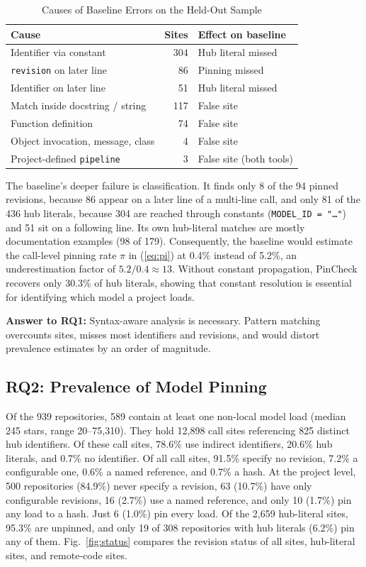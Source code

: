 \documentclass[conference]{IEEEtran}
\begin{document}
\begin{table}[t]
\centering
\caption{Causes of Baseline Errors on the Held-Out Sample}
\label{tab:causes}
\footnotesize
\setlength{\tabcolsep}{3pt}
\begin{tabular}{@{}lrl@{}}
\toprule
\textbf{Cause} & \textbf{Sites} & \textbf{Effect on baseline} \\
\midrule
Identifier via constant & 304 & Hub literal missed \\
\texttt{revision} on later line & 86 & Pinning missed \\
Identifier on later line & 51 & Hub literal missed \\
Match inside docstring / string & 117 & False site \\
Function definition & 74 & False site \\
Object invocation, message, class & 4 & False site \\
Project-defined \texttt{pipeline} & 3 & False site (both tools) \\
\bottomrule
\end{tabular}
\end{table}

The baseline's deeper failure is classification. It finds only 8 of the 94 pinned revisions, because 86 appear on a later line of a multi-line call, and only 81 of the 436 hub literals, because 304 are reached through constants (\texttt{MODEL\_ID = "\ldots"}) and 51 sit on a following line. Its own hub-literal matches are mostly documentation examples (98 of 179). Consequently, the baseline would estimate the call-level pinning rate $\pi$ in (\ref{eq:pi}) at 0.4\% instead of 5.2\%, an underestimation factor of $5.2/0.4 \approx 13$. Without constant propagation, PinCheck recovers only 30.3\% of hub literals, showing that constant resolution is essential for identifying which model a project loads. 

\textbf{Answer to RQ1:} Syntax-aware analysis is necessary. Pattern matching overcounts sites, misses most identifiers and revisions, and would distort prevalence estimates by an order of magnitude.

\subsection{RQ2: Prevalence of Model Pinning}
Of the 939 repositories, 589 contain at least one non-local model load (median 245 stars, range 20--75,310). They hold 12,898 call sites referencing 825 distinct hub identifiers. Of these call sites, 78.6\% use indirect identifiers, 20.6\% hub literals, and 0.7\% no identifier. Of all call sites, 91.5\% specify no revision, 7.2\% a configurable one, 0.6\% a named reference, and 0.7\% a hash. At the project level, 500 repositories (84.9\%) never specify a revision, 63 (10.7\%) have only configurable revisions, 16 (2.7\%) use a named reference, and only 10 (1.7\%) pin any load to a hash. Just 6 (1.0\%) pin every load. Of the 2,659 hub-literal sites, 95.3\% are unpinned, and only 19 of 308 repositories with hub literals (6.2\%) pin any of them. Fig.~\ref{fig:status} compares the revision status of all sites, hub-literal sites, and remote-code sites.
\end{document}
